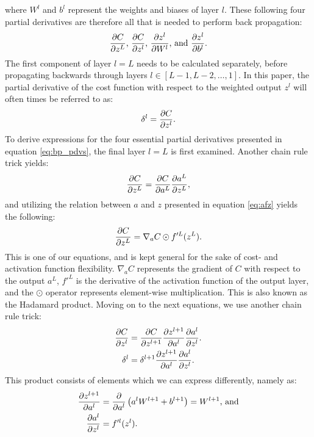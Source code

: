             where $W^l$ and $b^l$ represent the weights and biases of layer $l$. These following four partial derivatives are therefore all that is needed to perform back propagation:
            \begin{equation}\label{eq:bp_pdvs}
                \pdv{C}{z^L} \text{, } \pdv{C}{z^l} \text{, } \pdv{z^l}{W^l} \text{, and } \pdv{z^l}{b^l}.
            \end{equation}
            The first component of layer $l=L$ needs to be calculated separately, before propagating backwards through layers $l \in [L-1, L-2, \hdots, 1]$. In this paper, the partial derivative of the cost function with respect to the weighted output $z^l$ will often times be referred to as:
            \begin{equation}
                \delta^l = \pdv{C}{z^l}.
            \end{equation}
            To derive expressions for the four essential partial derivatives presented in equation \ref{eq:bp_pdvs}, the final layer $l=L$ is first examined. Another chain rule trick yields:
            \begin{equation}
                \pdv{C}{z^L} = \pdv{C}{a^L} \pdv{a^L}{z^L},
            \end{equation}
            and utilizing the relation between $a$ and $z$ presented in equation \ref{eq:afz} yields the following:
            \begin{equation}
                \pdv{C}{z^L} = \nabla_a C \odot f'^L(z^L).
            \end{equation}
            This is one of our equations, and is kept general for the sake of cost- and activation function flexibility. $\nabla_aC$ represents the gradient of $C$ with respect to the output $a^L$, $f'^L$ is the derivative of the activation function of the output layer, and the $\odot$ operator represents element-wise multiplication. This is also known as the Hadamard product. Moving on to the next equations, we use another chain rule trick:
            \begin{align}\label{eq:C/zl}
                \pdv{C}{z^l} &= \pdv{C}{z^{l+1}} \pdv{z^{l+1}}{a^l} \pdv{a^l}{z^l}.\\
                \delta^l &= \delta^{l+1} \pdv{z^{l+1}}{a^l} \pdv{a^l}{z^l}.
            \end{align}
            This product consists of elements which we can express differently, namely as:
            \begin{align}\label{eq:C/zl1}
                \pdv{z^{l+1}}{a^l} &= \pdv{}{a^l}\left( a^lW^{l+1} + b^{l+1} \right)=W^{l+1}\text{, and}\\\label{eq:C/zl2}
                \pdv{a^l}{z^l} &= f'^l(z^l).
            \end{align}
